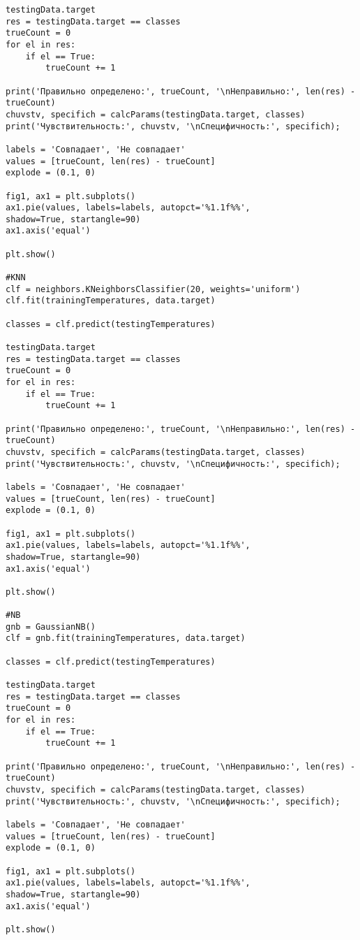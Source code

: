 \begin{verbatim}
testingData.target
res = testingData.target == classes
trueCount = 0
for el in res:
	if el == True:
		trueCount += 1

print('Правильно определено:', trueCount, '\nНеправильно:', len(res) - trueCount)
chuvstv, specifich = calcParams(testingData.target, classes)
print('Чувствительность:', chuvstv, '\nСпецифичность:', specifich);

labels = 'Совпадает', 'Не совпадает'
values = [trueCount, len(res) - trueCount]
explode = (0.1, 0)

fig1, ax1 = plt.subplots()
ax1.pie(values, labels=labels, autopct='%1.1f%%',
shadow=True, startangle=90)
ax1.axis('equal')

plt.show()

#KNN
clf = neighbors.KNeighborsClassifier(20, weights='uniform')
clf.fit(trainingTemperatures, data.target)

classes = clf.predict(testingTemperatures)

testingData.target
res = testingData.target == classes
trueCount = 0
for el in res:
	if el == True:
		trueCount += 1

print('Правильно определено:', trueCount, '\nНеправильно:', len(res) - trueCount)
chuvstv, specifich = calcParams(testingData.target, classes)
print('Чувствительность:', chuvstv, '\nСпецифичность:', specifich);

labels = 'Совпадает', 'Не совпадает'
values = [trueCount, len(res) - trueCount]
explode = (0.1, 0)

fig1, ax1 = plt.subplots()
ax1.pie(values, labels=labels, autopct='%1.1f%%',
shadow=True, startangle=90)
ax1.axis('equal')

plt.show()

#NB
gnb = GaussianNB()
clf = gnb.fit(trainingTemperatures, data.target)

classes = clf.predict(testingTemperatures)

testingData.target
res = testingData.target == classes
trueCount = 0
for el in res:
	if el == True:
		trueCount += 1

print('Правильно определено:', trueCount, '\nНеправильно:', len(res) - trueCount)
chuvstv, specifich = calcParams(testingData.target, classes)
print('Чувствительность:', chuvstv, '\nСпецифичность:', specifich);

labels = 'Совпадает', 'Не совпадает'
values = [trueCount, len(res) - trueCount]
explode = (0.1, 0)

fig1, ax1 = plt.subplots()
ax1.pie(values, labels=labels, autopct='%1.1f%%',
shadow=True, startangle=90)
ax1.axis('equal')

plt.show()
\end{verbatim}
